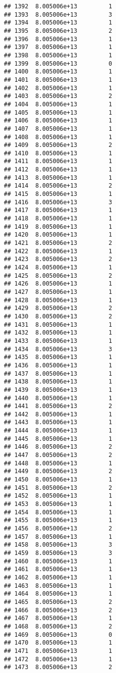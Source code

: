 \documentclass[
]{article}
\begin{document}
\begin{verbatim}
## 1392  8.005006e+13         1
## 1393  8.005006e+13         3
## 1394  8.005006e+13         1
## 1395  8.005006e+13         2
## 1396  8.005006e+13         1
## 1397  8.005006e+13         1
## 1398  8.005006e+13         1
## 1399  8.005006e+13         0
## 1400  8.005006e+13         1
## 1401  8.005006e+13         1
## 1402  8.005006e+13         1
## 1403  8.005006e+13         2
## 1404  8.005006e+13         1
## 1405  8.005006e+13         1
## 1406  8.005006e+13         1
## 1407  8.005006e+13         1
## 1408  8.005006e+13         1
## 1409  8.005006e+13         2
## 1410  8.005006e+13         1
## 1411  8.005006e+13         1
## 1412  8.005006e+13         1
## 1413  8.005006e+13         1
## 1414  8.005006e+13         2
## 1415  8.005006e+13         1
## 1416  8.005006e+13         3
## 1417  8.005006e+13         1
## 1418  8.005006e+13         1
## 1419  8.005006e+13         1
## 1420  8.005006e+13         1
## 1421  8.005006e+13         2
## 1422  8.005006e+13         1
## 1423  8.005006e+13         2
## 1424  8.005006e+13         1
## 1425  8.005006e+13         2
## 1426  8.005006e+13         1
## 1427  8.005006e+13         1
## 1428  8.005006e+13         1
## 1429  8.005006e+13         2
## 1430  8.005006e+13         2
## 1431  8.005006e+13         1
## 1432  8.005006e+13         1
## 1433  8.005006e+13         1
## 1434  8.005006e+13         3
## 1435  8.005006e+13         1
## 1436  8.005006e+13         1
## 1437  8.005006e+13         1
## 1438  8.005006e+13         1
## 1439  8.005006e+13         1
## 1440  8.005006e+13         1
## 1441  8.005006e+13         2
## 1442  8.005006e+13         1
## 1443  8.005006e+13         1
## 1444  8.005006e+13         1
## 1445  8.005006e+13         1
## 1446  8.005006e+13         2
## 1447  8.005006e+13         2
## 1448  8.005006e+13         1
## 1449  8.005006e+13         2
## 1450  8.005006e+13         1
## 1451  8.005006e+13         2
## 1452  8.005006e+13         1
## 1453  8.005006e+13         1
## 1454  8.005006e+13         1
## 1455  8.005006e+13         1
## 1456  8.005006e+13         2
## 1457  8.005006e+13         1
## 1458  8.005006e+13         3
## 1459  8.005006e+13         3
## 1460  8.005006e+13         1
## 1461  8.005006e+13         1
## 1462  8.005006e+13         1
## 1463  8.005006e+13         1
## 1464  8.005006e+13         1
## 1465  8.005006e+13         2
## 1466  8.005006e+13         2
## 1467  8.005006e+13         1
## 1468  8.005006e+13         2
## 1469  8.005006e+13         0
## 1470  8.005006e+13         1
## 1471  8.005006e+13         1
## 1472  8.005006e+13         1
## 1473  8.005006e+13         2

\end{verbatim}
\end{document}
